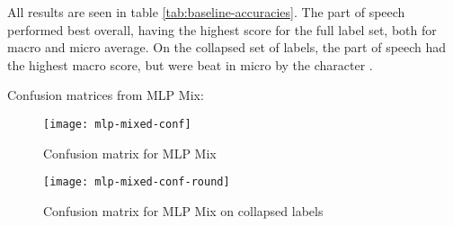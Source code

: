 All results are seen in table \ref{tab:baseline-accuracies}.
The part of speech \ngrams performed best overall, having the highest \FI score
for the full label set, both for macro and micro average. On the collapsed set
of labels, the part of speech \ngrams had the highest macro \FI score, but were
beat in micro \FI by the character \ngrams.

Confusion matrices from MLP Mix:

\begin{figure}
  \centering
  \texttt{[image: mlp-mixed-conf]}
  \caption{Confusion matrix for MLP Mix}
  \label{fig:mlp-mixed-conf}
\end{figure}

\begin{figure}
  \centering
  \texttt{[image: mlp-mixed-conf-round]}
  \caption{Confusion matrix for MLP Mix on collapsed labels}
  \label{fig:mlp-mixed-conf-round}
\end{figure}
